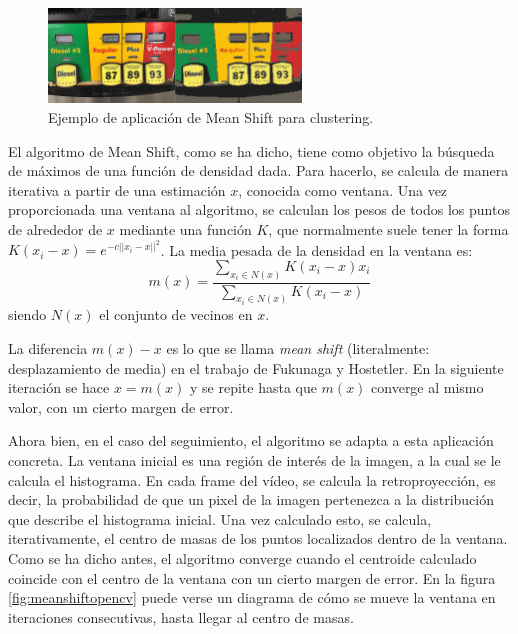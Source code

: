 \begin{figure}
    \centering
    \includegraphics[width=0.6\textwidth]{images/clustering}
    \caption{Ejemplo de aplicación de Mean Shift para clustering.}
    \label{fig:clustering}
\end{figure}

El algoritmo de Mean Shift, como se ha dicho, tiene como objetivo la búsqueda de máximos de una función de densidad dada. Para hacerlo, se calcula de manera iterativa a partir de una estimación $x$, conocida como ventana. Una vez proporcionada una ventana al algoritmo, se calculan los pesos de todos los puntos de alrededor de $x$ mediante una función $K$, que normalmente suele tener la forma $K(x_i-x) = e^{-c||x_i-x||^2}$. La media pesada de la densidad en la ventana es:
\[
  m(x) = \frac{\sum_{x_i\in N(x)}K(x_i-x)x_i}{\sum_{x_i\in N(x)}K(x_i-x)}
\]
siendo $N(x)$ el conjunto de vecinos en $x$.

La diferencia $m(x)-x$ es lo que se llama \textit{mean shift} (literalmente: desplazamiento de media) en el trabajo de Fukunaga y Hostetler. En la siguiente iteración se hace $x= m(x)$ y se repite hasta que $m(x)$ converge al mismo valor, con un cierto margen de error.

Ahora bien, en el caso del seguimiento, el algoritmo se adapta a esta aplicación concreta. La ventana inicial es una región de interés de la imagen, a la cual se le calcula el histograma. En cada frame del vídeo, se calcula la retroproyección, es decir, la probabilidad de que un pixel de la imagen pertenezca a la distribución que describe el histograma inicial. Una vez calculado esto, se calcula, iterativamente, el centro de masas de los puntos localizados dentro de la ventana. Como se ha dicho antes, el algoritmo converge cuando el centroide calculado coincide con el centro de la ventana con un cierto margen de error. En la figura \ref{fig:meanshiftopencv} puede verse un diagrama de cómo se mueve la ventana en iteraciones consecutivas, hasta llegar al centro de masas.

